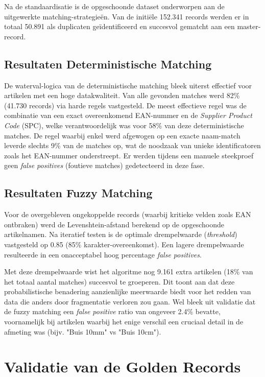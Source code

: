 Na de standaardisatie is de opgeschoonde dataset onderworpen aan de uitgewerkte matching-strategieën. Van de initiële 152.341 records werden er in totaal 50.891 als duplicaten geïdentificeerd en succesvol gematcht aan een master-record. 

\subsection{Resultaten Deterministische Matching}
De waterval-logica van de deterministische matching bleek uiterst effectief voor artikelen met een hoge datakwaliteit. Van alle gevonden matches werd 82\% (41.730 records) via harde regels vastgesteld. De meest effectieve regel was de combinatie van een exact overeenkomend EAN-nummer en de \textit{Supplier Product Code} (SPC), welke verantwoordelijk was voor 58\% van deze deterministische matches. De regel waarbij enkel werd afgewogen op een exacte naam-match leverde slechts 9\% van de matches op, wat de noodzaak van unieke identificatoren zoals het EAN-nummer onderstreept. Er werden tijdens een manuele steekproef geen \textit{false positives} (foutieve matches) gedetecteerd in deze fase.

\subsection{Resultaten Fuzzy Matching}
Voor de overgebleven ongekoppelde records (waarbij kritieke velden zoals EAN ontbraken) werd de Levenshtein-afstand berekend op de opgeschoonde artikelnamen. Na iteratief testen is de optimale drempelwaarde (\textit{threshold}) vastgesteld op 0.85 (85\% karakter-overeenkomst). Een lagere drempelwaarde resulteerde in een onacceptabel hoog percentage \textit{false positives}.

Met deze drempelwaarde wist het algoritme nog 9.161 extra artikelen (18\% van het totaal aantal matches) succesvol te groeperen. Dit toont aan dat deze probabilistische benadering aanzienlijke meerwaarde biedt voor het redden van data die anders door fragmentatie verloren zou gaan. Wel bleek uit validatie dat de fuzzy matching een \textit{false positive} ratio van ongeveer 2.4\% bevatte, voornamelijk bij artikelen waarbij het enige verschil een cruciaal detail in de afmeting was (bijv. "Buis 10mm" vs "Buis 10cm").

\section{Validatie van de Golden Records}%
\label{sec:res-survivorship}

